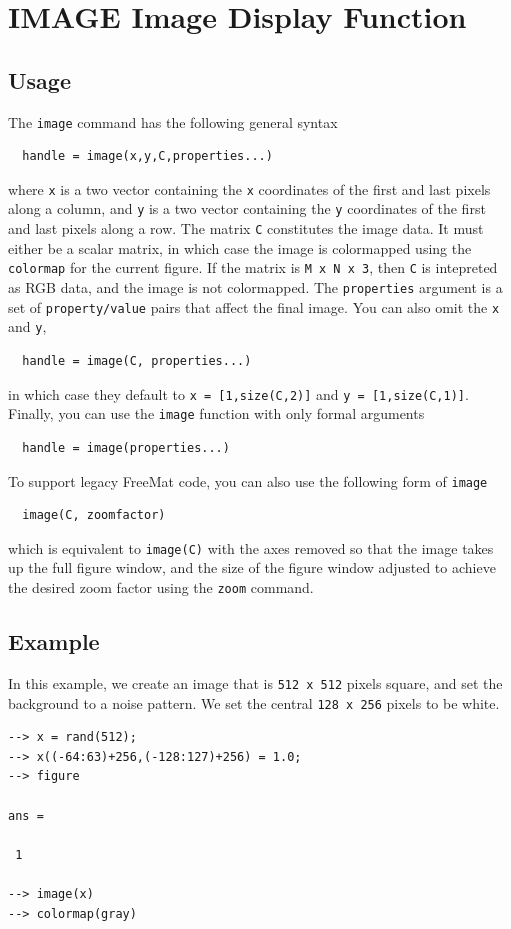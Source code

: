 \section{IMAGE Image Display Function}

\subsection{Usage}

The \verb|image| command has the following general syntax
\begin{verbatim}
  handle = image(x,y,C,properties...)
\end{verbatim}
where \verb|x| is a two vector containing the \verb|x| coordinates
of the first and last pixels along a column, and \verb|y| is a
two vector containing the \verb|y| coordinates of the first and
last pixels along a row.  The matrix \verb|C| constitutes the
image data.  It must either be a scalar matrix, in which case
the image is colormapped using the  \verb|colormap| for the current
figure.  If the matrix is \verb|M x N x 3|, then \verb|C| is intepreted
as RGB data, and the image is not colormapped.  The \verb|properties|
argument is a set of \verb|property/value| pairs that affect the
final image.  You can also omit the \verb|x| and \verb|y|, 
\begin{verbatim}
  handle = image(C, properties...)
\end{verbatim}
in which case they default to \verb|x = [1,size(C,2)]| and 
\verb|y = [1,size(C,1)]|.  Finally, you can use the \verb|image| function
with only formal arguments
\begin{verbatim}
  handle = image(properties...)
\end{verbatim}

To support legacy FreeMat code, you can also use the following
form of \verb|image|
\begin{verbatim}
  image(C, zoomfactor)
\end{verbatim}
which is equivalent to \verb|image(C)| with the axes removed so that
the image takes up the full figure window, and the size of the
figure window adjusted to achieve the desired zoom factor using the
\verb|zoom| command.
\subsection{Example}

In this example, we create an image that is \verb|512 x 512| pixels
square, and set the background to a noise pattern.  We set the central
\verb|128 x 256| pixels to be white.
\begin{verbatim}
--> x = rand(512);
--> x((-64:63)+256,(-128:127)+256) = 1.0;
--> figure

ans = 

 1 

--> image(x)
--> colormap(gray)
\end{verbatim}

